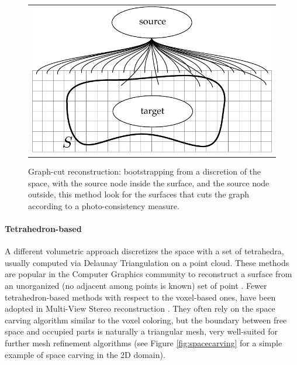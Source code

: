 \begin{figure}[t]
 \begin{tabular}{c}
  \includegraphics[width=0.98\columnwidth]{./img/ch_soa/graphcut}\\
 \end{tabular}
 \caption{Graph-cut reconstruction: bootstrapping from a discretion of the space, with the source node inside the surface, and the source node outside, this method look for the surfaces that cuts the graph according to a photo-consistency measure.}
 \label{fig:graphcut}
\end{figure}




\paragraph{Tetrahedron-based}
\label{sec:tet-based}
A different volumetric approach discretizes the space with a set of tetrahedra, usually computed via Delaunay Triangulation on a point cloud.
These methods are popular in the Computer Graphics community to reconstruct a surface from an unorganized (no adjacent among points is known) set of point \cite{amenta1999surface,amenta2001power,boissonnat1984geometric,dey2004provable,kolluri2004spectral}. 
Fewer tetrahedron-based methods with respect to the voxel-based ones, have been adopted in Multi-View Stereo reconstruction
\cite{faugeras_et_al_90,labatut2007efficient,salman2010surface,vu_et_al_2012,hiep2009towards,Pan_et_al09}.
They often rely on the space carving algorithm similar to the voxel coloring, but the boundary between free space and occupied parts is naturally a triangular mesh, very well-suited for further mesh refinement algorithms (see Figure \ref{fig:spacecarving} for a simple example of space carving in the 2D domain).




